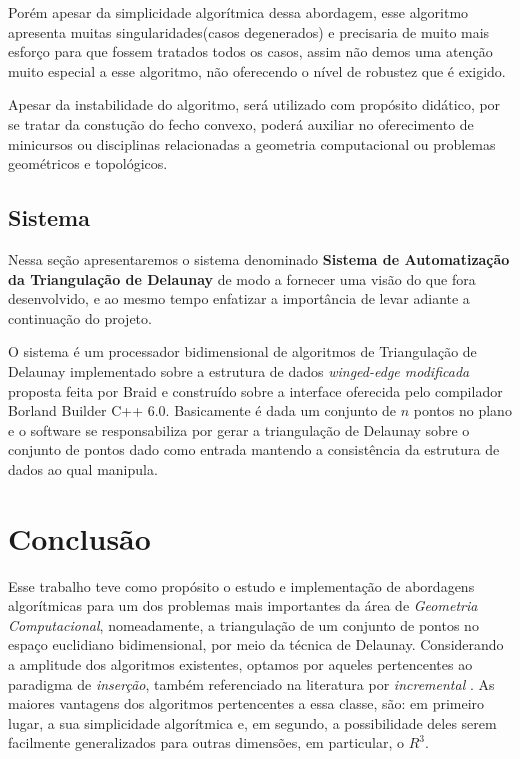 \documentclass[12pt,a4paper]{book}
\begin{document}
Por\'em apesar da simplicidade algor\'itmica dessa abordagem, esse algoritmo apresenta muitas singularidades(casos degenerados) e precisaria de muito mais esfor\c{c}o para que fossem tratados todos os casos, assim n\~ao demos uma aten\c{c}\~{a}o muito especial a esse algoritmo, n\~ao oferecendo o n\'ivel de robustez que \'e exigido.

Apesar da instabilidade do algoritmo, ser\'a utilizado com prop\'osito did\'atico, por se tratar da constu\c{c}\~{a}o do fecho convexo, poder\'a auxiliar no oferecimento de minicursos ou disciplinas relacionadas a geometria computacional ou problemas geom\'etricos e topol\'ogicos.
 
\section{Sistema}

Nessa se\c{c}\~{a}o apresentaremos o sistema denominado {\bf Sistema de Automatiza\c{c}\~{a}o da Triangula\c{c}\~{a}o de Delaunay} de modo a fornecer uma vis\~ao do que fora desenvolvido, e ao mesmo tempo enfatizar a import\^ancia de levar adiante a continua\c{c}\~{a}o do projeto.

O sistema \'e um processador bidimensional de algoritmos de Triangula\c{c}\~{a}o de Delaunay implementado sobre a estrutura de dados \textit{winged-edge modificada} proposta feita por Braid \cite{braid} e constru\'ido sobre a interface oferecida pelo compilador Borland Builder C++ 6.0. Basicamente \'e dada um conjunto de $n$ pontos no plano e o software se responsabiliza por gerar a triangula\c{c}\~{a}o de Delaunay sobre o conjunto de pontos dado como entrada mantendo a consist\^encia da estrutura de dados ao qual manipula.


\chapter{Conclus\~{a}o} \label{chapter5}

Esse trabalho teve como prop\'osito o estudo e implementa\c{c}\~{a}o de abordagens algor\'itmicas para um dos problemas mais importantes da \'area de \textit{Geometria Computacional}, nomeadamente, a triangula\c{c}\~{a}o de um conjunto de pontos no espa\c{c}o euclidiano bidimensional, por meio da t\'ecnica de Delaunay. Considerando a amplitude dos algoritmos existentes, optamos por aqueles pertencentes ao paradigma de \textit{inser\c{c}\~{a}o}, tamb\'em referenciado na literatura por \textit{incremental} \cite{berg}. As maiores vantagens dos algoritmos pertencentes a essa classe, s\~ao: em primeiro lugar, a sua simplicidade algor\'itmica e, em segundo, a possibilidade deles serem facilmente generalizados para outras dimens\~oes, em particular, o $R^{3}$.
\end{document}
